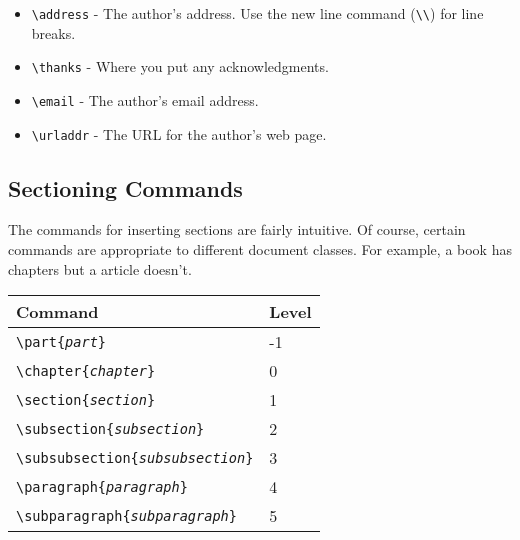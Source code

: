\documentclass{article}
\begin{document}
\begin{itemize}
    \item \texttt{\textbackslash address} - The author's address.  Use
    the new line command (\texttt{\textbackslash\textbackslash}) for
    line breaks.
    \item \texttt{\textbackslash thanks} - Where you put any acknowledgments.
    \item \texttt{\textbackslash email} - The author's email address.
    \item \texttt{\textbackslash urladdr} - The URL for the author's web page.
\end{itemize}
 
\subsection{Sectioning Commands}
The commands for inserting sections are fairly intuitive.  Of course,
certain commands are appropriate to different document classes.
For example, a book has chapters but a article doesn't.
 
\begin{center}
    \begin{tabular}{| l | l |} 
 
        \hline  %
        Command & Level \\ \hline  %
        \texttt{\textbackslash part\{\emph{part}\}} & -1 \\
        \texttt{\textbackslash chapter\{\emph{chapter}\}} & 0 \\
        \texttt{\textbackslash section\{\emph{section}\}} & 1 \\
        \texttt{\textbackslash subsection\{\emph{subsection}\}} & 2 \\
        \texttt{\textbackslash subsubsection\{\emph{subsubsection}\}} & 3 \\
        \texttt{\textbackslash paragraph\{\emph{paragraph}\}} & 4 \\
        \texttt{\textbackslash subparagraph\{\emph{subparagraph}\}} & 5 \\
        \hline
    \end{tabular}
\end{center}
 
\end{document}

